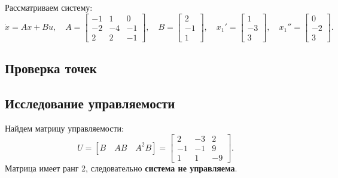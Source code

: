 Рассматриваем систему:
\begin{equation*}
    \dot x=Ax+Bu,\quad
    A=\begin{bmatrix}
        -1 & 1 & 0 \\ -2 & -4 & -1 \\ 2 & 2 & -1
    \end{bmatrix},\quad
    B=\begin{bmatrix}
        2 \\ -1 \\ 1
    \end{bmatrix},\quad
    x_1'=\begin{bmatrix}
        1 \\ -3 \\ 3
    \end{bmatrix},\quad
    x_1''=\begin{bmatrix}
        0\\-2\\3
    \end{bmatrix}.
\end{equation*}

\subsection{Проверка точек}


\subsection{Исследование управляемости}

Найдем матрицу управляемости:
\begin{equation*}
    U=[B\quad AB\quad A^2B]=
    \begin{bmatrix}
        2 & -3 & 2 \\ -1 & -1 & 9 \\ 1 & 1 & -9
    \end{bmatrix}.
\end{equation*}
Матрица имеет ранг 2, следовательно \textbf{система не управляема}.

